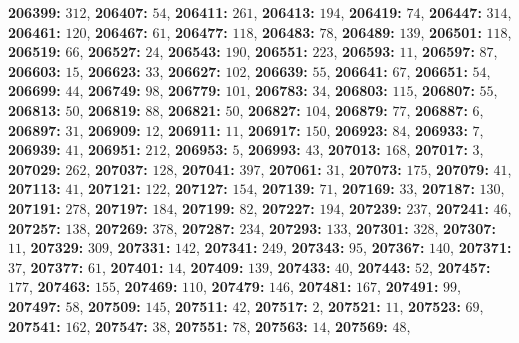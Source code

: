 \textsf{\bfseries 206399:} $312$, \textsf{\bfseries 206407:} $54$, \textsf{\bfseries 206411:} $261$, \textsf{\bfseries 206413:} $194$, \textsf{\bfseries 206419:} $74$, \textsf{\bfseries 206447:} $314$, \textsf{\bfseries 206461:} $120$, \textsf{\bfseries 206467:} $61$, \textsf{\bfseries 206477:} $118$, \textsf{\bfseries 206483:} $78$, \textsf{\bfseries 206489:} $139$, \textsf{\bfseries 206501:} $118$, \textsf{\bfseries 206519:} $66$, \textsf{\bfseries 206527:} $24$, \textsf{\bfseries 206543:} $190$, \textsf{\bfseries 206551:} $223$, \textsf{\bfseries 206593:} $11$, \textsf{\bfseries 206597:} $87$, \textsf{\bfseries 206603:} $15$, \textsf{\bfseries 206623:} $33$, \textsf{\bfseries 206627:} $102$, \textsf{\bfseries 206639:} $55$, \textsf{\bfseries 206641:} $67$, \textsf{\bfseries 206651:} $54$, \textsf{\bfseries 206699:} $44$, \textsf{\bfseries 206749:} $98$, \textsf{\bfseries 206779:} $101$, \textsf{\bfseries 206783:} $34$, \textsf{\bfseries 206803:} $115$, \textsf{\bfseries 206807:} $55$, \textsf{\bfseries 206813:} $50$, \textsf{\bfseries 206819:} $88$, \textsf{\bfseries 206821:} $50$, \textsf{\bfseries 206827:} $104$, \textsf{\bfseries 206879:} $77$, \textsf{\bfseries 206887:} $6$, \textsf{\bfseries 206897:} $31$, \textsf{\bfseries 206909:} $12$, \textsf{\bfseries 206911:} $11$, \textsf{\bfseries 206917:} $150$, \textsf{\bfseries 206923:} $84$, \textsf{\bfseries 206933:} $7$, \textsf{\bfseries 206939:} $41$, \textsf{\bfseries 206951:} $212$, \textsf{\bfseries 206953:} $5$, \textsf{\bfseries 206993:} $43$, \textsf{\bfseries 207013:} $168$, \textsf{\bfseries 207017:} $3$, \textsf{\bfseries 207029:} $262$, \textsf{\bfseries 207037:} $128$, \textsf{\bfseries 207041:} $397$, \textsf{\bfseries 207061:} $31$, \textsf{\bfseries 207073:} $175$, \textsf{\bfseries 207079:} $41$, \textsf{\bfseries 207113:} $41$, \textsf{\bfseries 207121:} $122$, \textsf{\bfseries 207127:} $154$, \textsf{\bfseries 207139:} $71$, \textsf{\bfseries 207169:} $33$, \textsf{\bfseries 207187:} $130$, \textsf{\bfseries 207191:} $278$, \textsf{\bfseries 207197:} $184$, \textsf{\bfseries 207199:} $82$, \textsf{\bfseries 207227:} $194$, \textsf{\bfseries 207239:} $237$, \textsf{\bfseries 207241:} $46$, \textsf{\bfseries 207257:} $138$, \textsf{\bfseries 207269:} $378$, \textsf{\bfseries 207287:} $234$, \textsf{\bfseries 207293:} $133$, \textsf{\bfseries 207301:} $328$, \textsf{\bfseries 207307:} $11$, \textsf{\bfseries 207329:} $309$, \textsf{\bfseries 207331:} $142$, \textsf{\bfseries 207341:} $249$, \textsf{\bfseries 207343:} $95$, \textsf{\bfseries 207367:} $140$, \textsf{\bfseries 207371:} $37$, \textsf{\bfseries 207377:} $61$, \textsf{\bfseries 207401:} $14$, \textsf{\bfseries 207409:} $139$, \textsf{\bfseries 207433:} $40$, \textsf{\bfseries 207443:} $52$, \textsf{\bfseries 207457:} $177$, \textsf{\bfseries 207463:} $155$, \textsf{\bfseries 207469:} $110$, \textsf{\bfseries 207479:} $146$, \textsf{\bfseries 207481:} $167$, \textsf{\bfseries 207491:} $99$, \textsf{\bfseries 207497:} $58$, \textsf{\bfseries 207509:} $145$, \textsf{\bfseries 207511:} $42$, \textsf{\bfseries 207517:} $2$, \textsf{\bfseries 207521:} $11$, \textsf{\bfseries 207523:} $69$, \textsf{\bfseries 207541:} $162$, \textsf{\bfseries 207547:} $38$, \textsf{\bfseries 207551:} $78$, \textsf{\bfseries 207563:} $14$, \textsf{\bfseries 207569:} $48$, 
